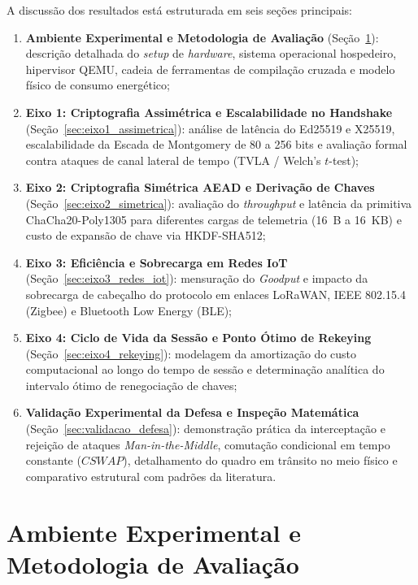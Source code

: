 A discussão dos resultados está estruturada em seis seções principais:
\begin{enumerate}
    \item \textbf{Ambiente Experimental e Metodologia de Avaliação} (Seção~\ref{sec:ambiente_experimental}): descrição detalhada do \textit{setup} de \textit{hardware}, sistema operacional hospedeiro, hipervisor QEMU, cadeia de ferramentas de compilação cruzada e modelo físico de consumo energético;
    \item \textbf{Eixo 1: Criptografia Assimétrica e Escalabilidade no Handshake} (Seção~\ref{sec:eixo1_assimetrica}): análise de latência do Ed25519 e X25519, escalabilidade da Escada de Montgomery de 80 a 256 bits e avaliação formal contra ataques de canal lateral de tempo (TVLA / Welch's $t$-test);
    \item \textbf{Eixo 2: Criptografia Simétrica AEAD e Derivação de Chaves} (Seção~\ref{sec:eixo2_simetrica}): avaliação do \textit{throughput} e latência da primitiva ChaCha20-Poly1305 para diferentes cargas de telemetria (16~B a 16~KB) e custo de expansão de chave via HKDF-SHA512;
    \item \textbf{Eixo 3: Eficiência e Sobrecarga em Redes IoT} (Seção~\ref{sec:eixo3_redes_iot}): mensuração do \textit{Goodput} e impacto da sobrecarga de cabeçalho do protocolo em enlaces LoRaWAN, IEEE 802.15.4 (Zigbee) e Bluetooth Low Energy (BLE);
    \item \textbf{Eixo 4: Ciclo de Vida da Sessão e Ponto Ótimo de Rekeying} (Seção~\ref{sec:eixo4_rekeying}): modelagem da amortização do custo computacional ao longo do tempo de sessão e determinação analítica do intervalo ótimo de renegociação de chaves;
    \item \textbf{Validação Experimental da Defesa e Inspeção Matemática} (Seção~\ref{sec:validacao_defesa}): demonstração prática da interceptação e rejeição de ataques \textit{Man-in-the-Middle}, comutação condicional em tempo constante ($CSWAP$), detalhamento do quadro em trânsito no meio físico e comparativo estrutural com padrões da literatura.
\end{enumerate}

\section{Ambiente Experimental e Metodologia de Avaliação}
\label{sec:ambiente_experimental}

